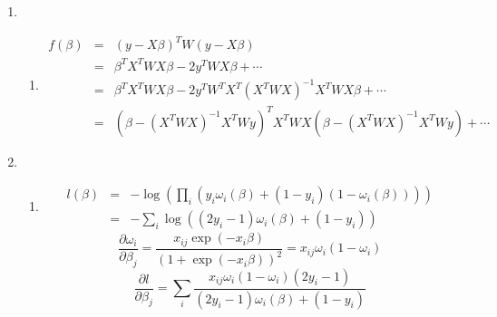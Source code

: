 \documentclass{article}
\begin{document}
\begin{enumerate}
\item
\begin{enumerate}[A]
\item
\begin{eqnarray}
f(\beta)&=&(y-X\beta)^TW(y-X\beta)\nonumber\\
&=&\beta^TX^TWX\beta-2y^TWX\beta+\cdots\nonumber\\
&=&\beta^T X^TWX\beta-2y^TW^TX^T(X^TWX)^{-1}X^TWX\beta+\cdots\nonumber\\
&=&(\beta-(X^TWX)^{-1}X^TWy)^TX^TWX(\beta-(X^TWX)^{-1}X^TWy)+\cdots
\end{eqnarray}
\end{enumerate}
\item
\begin{enumerate}[A]
\item
\begin{eqnarray}
l(\beta)&=&-\log(\prod_i(y_i\omega_i(\beta)+(1-y_i)(1-\omega_i(\beta))))\nonumber\\
&=&-\sum_i\log((2y_i-1)\omega_i(\beta)+(1-y_i))
\end{eqnarray}
\[
\frac{\partial\omega_i}{\partial\beta_j}=\frac{x_{ij}\exp(-x_i\beta)}{(1+\exp(-x_i\beta))^2}=x_{ij}\omega_i(1-\omega_i)
\]
\[
\frac{\partial l}{\partial\beta_j}=\sum_i\frac{x_{ij}\omega_i(1-\omega_i)(2y_i-1)}{(2y_i-1)\omega_i(\beta)+(1-y_i)}
\]
\end{enumerate}
\end{enumerate}
\end{document}
